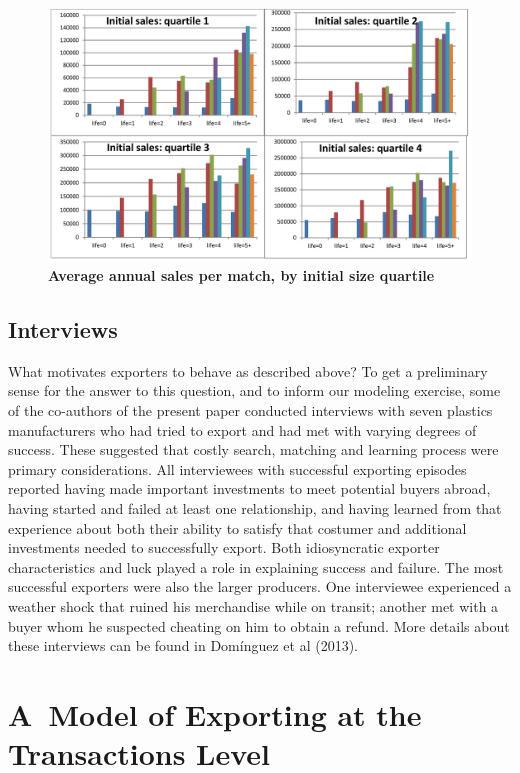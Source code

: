 \documentclass[12pt]{article}
\begin{document}
\begin{center}
\begin{figure}[tbp]
\includegraphics[width=\textwidth]{figures/Figure_1_quadrants_v2.png}
\caption{\textbf{Average annual sales per match, by initial size quartile}}
\label{fig:match_maturation}
\end{figure}
\end{center}

\subsection{Interviews}
What motivates exporters to behave as described above? To get a preliminary sense for the answer to this question, and to inform our modeling exercise, some of the co-authors of the present paper conducted interviews with seven plastics manufacturers who had tried to export and had met with varying degrees of success.  These suggested that costly search, matching and learning process were primary considerations. All interviewees with successful exporting episodes reported having made important investments to meet potential buyers abroad, having started and failed at least one relationship, and having learned from that experience about both their ability to satisfy that costumer and additional investments needed to successfully export. Both idiosyncratic exporter characteristics and luck played a role in explaining success and failure. The most successful exporters were also the larger producers. One interviewee experienced a weather shock that ruined his merchandise while on transit; another met with a buyer whom he suspected cheating on him to obtain a refund. More details about these interviews can be found in Domínguez et al (2013). 

\section{A\ Model of Exporting at the Transactions Level}
\end{document}
